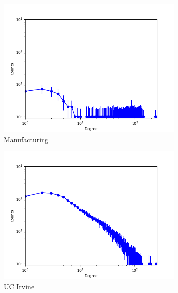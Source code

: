 \begin{figure}[h]
\begin{subfigure}[b]{0.300\textwidth}
            \includegraphics[width=\textwidth]{img/corpus/immsb_manufacturing_0}
            \caption {{\small Manufacturing}}    
        \end{subfigure}
        \begin{subfigure}[b]{0.300\textwidth}
            \centering
            \includegraphics[width=\textwidth]{img/corpus/immsb_ucirvine_0}
            \caption {{\small UC Irvine}}    
            \label{fig:mean and std of net14}
        \end{subfigure}
        \begin{subfigure}[b]{0.300\textwidth}
            \centering

\end{subfigure}
\end{figure}
